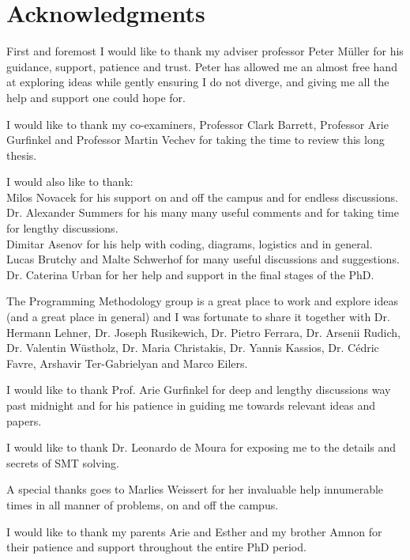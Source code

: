 \chapter*{Acknowledgments}

First and foremost I would like to thank my adviser professor Peter M{\"u}ller for his guidance, support, patience and trust. Peter has allowed me an almost free hand at exploring ideas while gently ensuring I do not diverge, and giving me all the help and support one could hope for.

I would like to thank my co-examiners, Professor Clark Barrett, Professor Arie Gurfinkel and Professor Martin Vechev for taking the time to review this long thesis.

I would also like to thank:\\
Milos Novacek for his support on and off the campus and for endless discussions.\\
Dr. Alexander Summers for his many many useful comments and for taking time for lengthy discussions.\\
Dimitar Asenov for his help with coding, diagrams, logistics and in general.\\
Lucas Brutchy and Malte Schwerhof for many useful discussions and suggestions.\\
Dr. Caterina Urban for her help and support in the final stages of the PhD.

The Programming Methodology group is a great place to work and explore ideas (and a great place in general) and I was fortunate to share it together with Dr. Hermann Lehner, Dr. Joseph Rusikewich, Dr. Pietro Ferrara, Dr. Arsenii Rudich, Dr. Valentin Wüstholz, Dr. Maria Christakis, Dr. Yannis Kassios, Dr. Cédric Favre, Arshavir Ter-Gabrielyan and Marco Eilers.

I would like to thank Prof. Arie Gurfinkel for deep and lengthy discussions way past midnight and for his patience in guiding me towards relevant ideas and papers.

I would like to thank Dr. Leonardo de Moura for exposing me to the details and secrets of SMT solving.

A special thanks goes to Marlies Weissert for her invaluable help innumerable times in all manner of problems, on and off the campus.

I would like to thank my parents Arie and Esther and my brother Amnon for their patience and support throughout the entire PhD period.




\newpage
